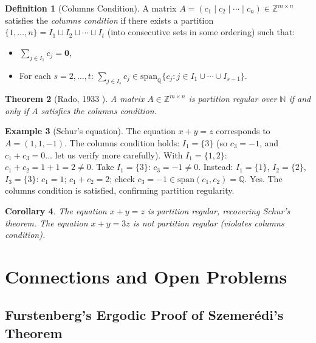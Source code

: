\documentclass[12pt,a4paper]{amsart}
\newtheorem{theorem}{Theorem}[section]
\newtheorem{corollary}[theorem]{Corollary}
\theoremstyle{definition}
\newtheorem{definition}[theorem]{Definition}
\newtheorem{example}[theorem]{Example}
\newcommand{\N}{\mathbb{N}}
\newcommand{\Z}{\mathbb{Z}}
\newcommand{\Q}{\mathbb{Q}}
\begin{document}
\begin{definition}[Columns Condition]
A matrix $A = (c_1 \mid c_2 \mid \cdots \mid c_n) \in \Z^{m \times n}$ satisfies
the \emph{columns condition} if there exists a partition $\{1,\ldots,n\} = I_1 \sqcup
I_2 \sqcup \cdots \sqcup I_t$ (into consecutive sets in some ordering) such that:
\begin{itemize}
\item $\sum_{j \in I_1} c_j = \mathbf{0}$,
\item For each $s = 2, \ldots, t$: $\sum_{j \in I_s} c_j \in \mathrm{span}_\Q\{c_j : j \in I_1 \cup \cdots \cup I_{s-1}\}$.
\end{itemize}
\end{definition}

\begin{theorem}[Rado, 1933 \cite{Rado1933}]\label{thm:rado}
A matrix $A \in \Z^{m \times n}$ is partition regular over $\N$ if and only if $A$
satisfies the columns condition.
\end{theorem}

\begin{example}[Schur's equation]
The equation $x + y = z$ corresponds to $A = (1, 1, -1)$. The columns condition
holds: $I_1 = \{3\}$ (so $c_3 = -1$, and $c_1 + c_3 = 0$... let us verify more
carefully). With $I_1 = \{1,2\}$: $c_1 + c_2 = 1 + 1 = 2 \neq 0$. Take
$I_1 = \{3\}$: $c_3 = -1 \neq 0$. Instead: $I_1 = \{1\}$, $I_2 = \{2\}$,
$I_3 = \{3\}$: $c_1 = 1$; $c_1 + c_2 = 2$; check $c_3 = -1 \in \mathrm{span}(c_1, c_2) = \Q$. Yes.
The columns condition is satisfied, confirming partition regularity.
\end{example}

\begin{corollary}
The equation $x + y = z$ is partition regular, recovering Schur's theorem.
The equation $x + y = 3z$ is \emph{not} partition regular (violates columns condition).
\end{corollary}

\section{Connections and Open Problems}\label{sec:connections}

\subsection{Furstenberg's Ergodic Proof of Szemer\'edi's Theorem}
\end{document}
